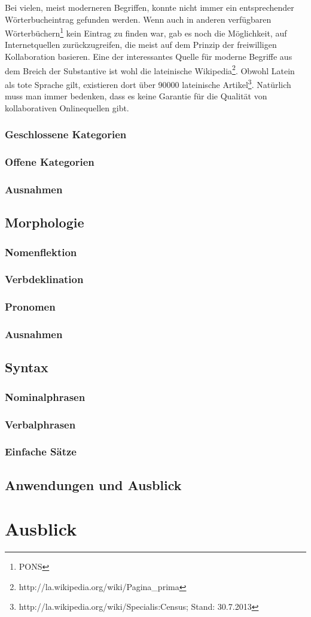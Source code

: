 \documentclass[11pt]{scrartcl}
\begin{document}
Bei vielen, meist moderneren Begriffen, konnte nicht immer ein entsprechender Wörterbucheintrag gefunden werden. Wenn auch in anderen verfügbaren Wörterbüchern\footnote{PONS} kein Eintrag zu finden war, gab es noch die Möglichkeit, auf Internetquellen zurückzugreifen, die meist auf dem Prinzip der freiwilligen Kollaboration basieren. Eine der interessantes Quelle für moderne Begriffe aus dem Breich der Substantive ist wohl die lateinische Wikipedia\footnote{http://la.wikipedia.org/wiki/Pagina\_prima}. Obwohl Latein als tote Sprache gilt, existieren dort über 90000 lateinische Artikel\footnote{http://la.wikipedia.org/wiki/Specialis:Census; Stand: 30.7.2013}. Natürlich muss man immer bedenken, dass es keine Garantie für die Qualität von kollaborativen Onlinequellen gibt.
\subsubsection{Geschlossene Kategorien}
\subsubsection{Offene Kategorien}
\subsubsection{Ausnahmen} 
\subsection{Morphologie}
\subsubsection{Nomenflektion}
\subsubsection{Verbdeklination}
\subsubsection{Pronomen}
\subsubsection{Ausnahmen}
\subsection{Syntax}
\subsubsection{Nominalphrasen}
\subsubsection{Verbalphrasen}
\subsubsection{Einfache Sätze}
\subsection{Anwendungen und Ausblick}
\section{Ausblick}
\end{document}
